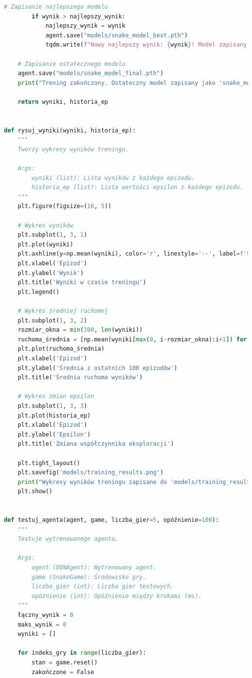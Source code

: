 \documentclass[a4paper,12pt]{article}
\begin{document}
\begin{lstlisting}[language=Python]
        # Zapisanie najlepszego modelu
        if wynik > najlepszy_wynik:
            najlepszy_wynik = wynik
            agent.save("models/snake_model_best.pth")
            tqdm.write(f"Nowy najlepszy wynik: {wynik}! Model zapisany jako 'snake_model_best.pth'")
    
    # Zapisanie ostatecznego modelu
    agent.save("models/snake_model_final.pth")
    print("Trening zakończony. Ostateczny model zapisany jako 'snake_model_final.pth'")
    
    return wyniki, historia_ep


def rysuj_wyniki(wyniki, historia_ep):
    """
    Tworzy wykresy wyników treningu.
    
    Args:
        wyniki (list): Lista wyników z każdego epizodu.
        historia_ep (list): Lista wartości epsilon z każdego epizodu.
    """
    plt.figure(figsize=(16, 5))
    
    # Wykres wyników
    plt.subplot(1, 3, 1)
    plt.plot(wyniki)
    plt.axhline(y=np.mean(wyniki), color='r', linestyle='--', label=f'Średnia: {np.mean(wyniki):.2f}')
    plt.xlabel('Epizod')
    plt.ylabel('Wynik')
    plt.title('Wyniki w czasie treningu')
    plt.legend()
    
    # Wykres średniej ruchomej
    plt.subplot(1, 3, 2)
    rozmiar_okna = min(100, len(wyniki))
    ruchoma_średnia = [np.mean(wyniki[max(0, i-rozmiar_okna):i+1]) for i in range(len(wyniki))]
    plt.plot(ruchoma_średnia)
    plt.xlabel('Epizod')
    plt.ylabel('Średnia z ostatnich 100 epizodów')
    plt.title('Średnia ruchoma wyników')
    
    # Wykres zmian epsilon
    plt.subplot(1, 3, 3)
    plt.plot(historia_ep)
    plt.xlabel('Epizod')
    plt.ylabel('Epsilon')
    plt.title('Zmiana współczynnika eksploracji')
    
    plt.tight_layout()
    plt.savefig('models/training_results.png')
    print("Wykresy wyników treningu zapisane do 'models/training_results.png'")
    plt.show()


def testuj_agenta(agent, game, liczba_gier=5, opóźnienie=100):
    """
    Testuje wytrenowanego agenta.
    
    Args:
        agent (DQNAgent): Wytrenowany agent.
        game (SnakeGame): Środowisko gry.
        liczba_gier (int): Liczba gier testowych.
        opóźnienie (int): Opóźnienie między krokami (ms).
    """
    łączny_wynik = 0
    maks_wynik = 0
    wyniki = []
    
    for indeks_gry in range(liczba_gier):
        stan = game.reset()
        zakończone = False
        

\end{lstlisting}
\end{document}
